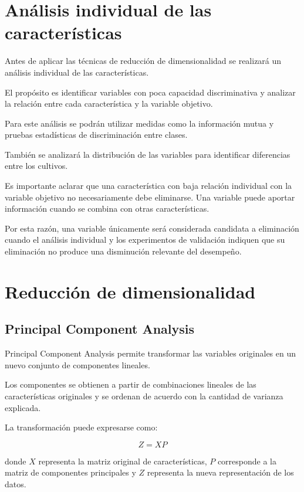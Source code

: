 \documentclass[conference]{IEEEtran}
\begin{document}
\section{Análisis individual de las características}

Antes de aplicar las técnicas de reducción de dimensionalidad se realizará un análisis individual de las características.

El propósito es identificar variables con poca capacidad discriminativa y analizar la relación entre cada característica y la variable objetivo.

Para este análisis se podrán utilizar medidas como la información mutua y pruebas estadísticas de discriminación entre clases.

También se analizará la distribución de las variables para identificar diferencias entre los cultivos.

Es importante aclarar que una característica con baja relación individual con la variable objetivo no necesariamente debe eliminarse. Una variable puede aportar información cuando se combina con otras características.

Por esta razón, una variable únicamente será considerada candidata a eliminación cuando el análisis individual y los experimentos de validación indiquen que su eliminación no produce una disminución relevante del desempeño.


\section{Reducción de dimensionalidad}

\subsection{Principal Component Analysis}

Principal Component Analysis permite transformar las variables originales en un nuevo conjunto de componentes lineales.

Los componentes se obtienen a partir de combinaciones lineales de las características originales y se ordenan de acuerdo con la cantidad de varianza explicada.

La transformación puede expresarse como:

\begin{equation}
Z=XP
\end{equation}

donde $X$ representa la matriz original de características, $P$ corresponde a la matriz de componentes principales y $Z$ representa la nueva representación de los datos.
\end{document}
